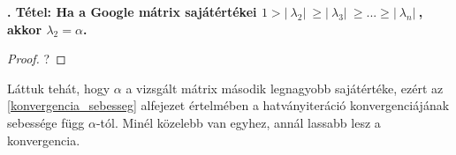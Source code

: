 \documentclass[12pt,a4paper]{article}
\newcounter{tszam}
\newenvironment{tetel}[1]
{{\medskip}\noindent \stepcounter{tszam}
{\bfseries{\thetszam. Tétel: #1\\[1ex]}}}{\bigskip }
\begin{document}
\begin{tetel}{Ha a Google mátrix sajátértékei $ 1 > |\ \lambda_2 |\ \geq |\ \lambda_3 |\ \geq ... \geq |\ \lambda_n |\ $, akkor $\lambda_2 = \alpha$. }
\end{tetel}
\begin{proof}
	?
\end{proof}

Láttuk tehát, hogy $\alpha$ a vizsgált mátrix második legnagyobb sajátértéke, ezért az \ref{konvergencia_sebesseg} alfejezet értelmében a hatványiteráció konvergenciájának sebessége függ $\alpha$-tól. Minél közelebb van egyhez, annál lassabb lesz a konvergencia.



\end{document}
